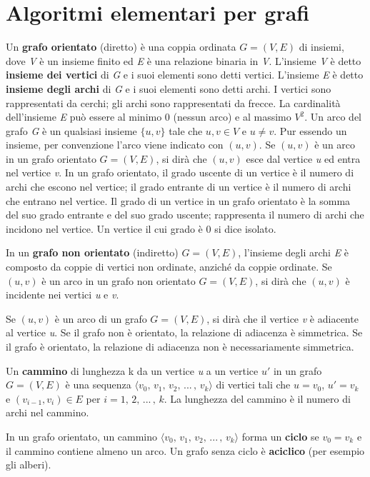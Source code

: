 \documentclass[10pt, a4paper]{report}
\begin{document}
\chapter{Algoritmi elementari per grafi}
Un \textbf{grafo orientato} (diretto) è una coppia ordinata $G = (V,E)$ di insiemi, dove \textit{V} è un insieme finito ed \textit{E} è una relazione binaria in \textit{V}. L'insieme \textit{V} è detto \textbf{insieme dei vertici} di \textit{G} e i suoi elementi sono detti vertici. L'insieme \textit{E} è detto \textbf{insieme degli archi} di \textit{G} e i suoi elementi sono detti archi. I vertici sono rappresentati da cerchi; gli archi sono rappresentati da frecce. La cardinalità dell'insieme \textit{E} può essere al minimo 0 (nessun arco) e al massimo $V^2$. Un arco del grafo \textit{G} è un qualsiasi insieme $\{u,v\}$ tale che $u,v \in V$ e $u \neq v$. Pur essendo un insieme, per convenzione l'arco viene indicato con $(u,v)$. Se $(u,v)$ è un arco in un grafo orientato $G = (V,E)$, si dirà che $(u,v)$ esce dal vertice \textit{u} ed entra nel vertice \textit{v}. In un grafo orientato, il grado uscente di un vertice è il numero di archi che escono nel vertice; il grado entrante di un vertice è il numero di archi che entrano nel vertice. Il grado di un vertice in un grafo orientato è la somma del suo grado entrante e del suo grado uscente; rappresenta il numero di archi che incidono nel vertice. Un vertice il cui grado è 0 si dice isolato.

In un \textbf{grafo non orientato} (indiretto) $G = (V,E)$, l'insieme degli archi \textit{E} è composto da coppie di vertici non ordinate, anziché da coppie ordinate. Se $(u,v)$ è un arco in un grafo non orientato $G = (V,E)$, si dirà che $(u,v)$ è incidente nei vertici \textit{u} e \textit{v}.

Se $(u,v)$ è un arco di un grafo $G = (V,E)$, si dirà che il vertice \textit{v} è adiacente al vertice \textit{u}. Se il grafo non è orientato, la relazione di adiacenza è simmetrica. Se il grafo è orientato, la relazione di adiacenza non è necessariamente simmetrica.

Un \textbf{cammino} di lunghezza k da un vertice \textit{u} a un vertice $u'$ in un grafo $G = (V,E)$ è una sequenza $\langle v_0,\,v_1,\,v_2,\,...\,,\,v_k\rangle$ di vertici tali che $u = v_0$, $u' = v_k$ e $(v_{i-1},v_i) \in E$ per $i = 1,\,2,\,...\,,\,k$. La lunghezza del cammino è il numero di archi nel cammino.

In un grafo orientato, un cammino $\langle v_0,\,v_1,\,v_2,\,...\,,\,v_k\rangle$ forma un \textbf{ciclo} se $v_0 = v_k$ e il cammino contiene almeno un arco. Un grafo senza ciclo è \textbf{aciclico} (per esempio gli alberi).
\end{document}
